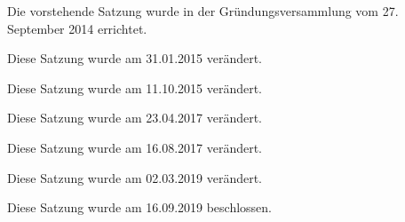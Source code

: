 \documentclass[11pt,a4paper,twoside,openany,article]{memoir}
\begin{document}
\begin{changes}
\item Die vorstehende Satzung wurde in der Gründungsversammlung vom 27. September 2014 errichtet.
\item Diese Satzung wurde am 31.01.2015 verändert.
\item Diese Satzung wurde am 11.10.2015 verändert.
\item Diese Satzung wurde am 23.04.2017 verändert.
\item Diese Satzung wurde am 16.08.2017 verändert.
\item Diese Satzung wurde am 02.03.2019 verändert.
\item Diese Satzung wurde am 16.09.2019 beschlossen.
\end{changes}
\end{document}
